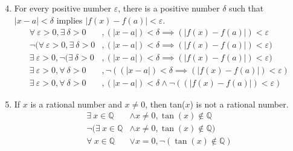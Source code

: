\documentclass{article}
\begin{document}
\subsection{}
\begin{enumerate}
    \setcounter{enumi}{3}
    \item For every positive number $\varepsilon$, there is a positive number
            $\delta$ such that $|x - a| < \delta$ implies $|f(x) - f(a)| < \varepsilon$.
    \[ 
        \begin{aligned}
            \forall \ \varepsilon > 0, \exists \ \delta > 0&, (|x - a|) < \delta \implies (|f(x) - f(a)|) < \varepsilon \\
            \neg (\forall \ \varepsilon > 0, \exists \ \delta > 0&, (|x - a|) < \delta \implies (|f(x) - f(a)|) < \varepsilon) \\
            \exists \ \varepsilon > 0, \neg (\exists \ \delta > 0&, (|x - a|) < \delta \implies (|f(x) - f(a)|) < \varepsilon) \\
            \exists \ \varepsilon > 0, \forall \ \delta > 0&, \neg ((|x - a|) < \delta \implies (|f(x) - f(a)|) < \varepsilon) \\
            \exists \ \varepsilon > 0, \forall \ \delta > 0&, (|x - a|) < \delta \land \neg ((|f(x) - f(a)|) < \varepsilon)
        \end{aligned} 
    \]
    \setcounter{enumi}{7}
    \item If $x$ is a rational number and $x \ne 0$, then tan($x$) is not a rational number.
    \[
        \begin{aligned}
            \exists \ x \in \mathbb{Q}& \land x \ne 0, \tan(x) \notin \mathbb{Q} \\
            \neg (\exists \ x \in \mathbb{Q} &\land x \ne 0, \tan(x) \notin \mathbb{Q}) \\
            \forall \ x \in \mathbb{Q} &\lor x = 0, \neg(\tan(x) \notin \mathbb{Q}) \\
        \end{aligned}
    \]
    

\end{enumerate}
\end{document}
